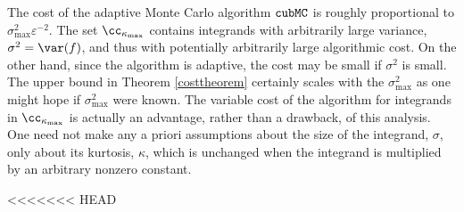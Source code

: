 \documentclass[graybox]{svmult}
\newcommand{\aMC}{{\tt cubMC}\xspace}
\begin{document}
The cost of the adaptive Monte Carlo algorithm $\aMC$ is roughly proportional to $\sigma^2_{\max}\varepsilon^{-2}$.  The set $\cc_{\kappa_{\max}}$ contains integrands with arbitrarily large variance, $\sigma^2=\var(f)$, and thus with potentially arbitrarily large algorithmic cost.  On the other hand, since the algorithm is adaptive, the cost may be small if $\sigma^2$ is small.  The upper bound in Theorem \ref{costtheorem} certainly scales with the $\sigma^2_{\max}$ as one might hope if $\sigma^2_{\max}$ were known.  The variable cost of the algorithm for integrands in $\cc_{\kappa_{\max}}$ is actually an advantage, rather than a drawback, of this analysis.  One need not make any a priori assumptions about the size of the integrand, $\sigma$, only about its kurtosis, $\kappa$, which is unchanged when the integrand is multiplied by an arbitrary nonzero constant.

<<<<<<< HEAD
\end{document}
